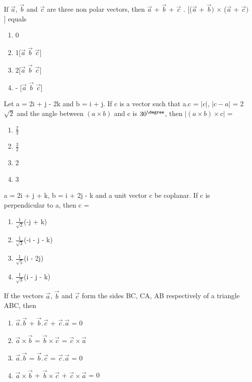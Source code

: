 \item If $\overrightarrow{a}$, $\overrightarrow{b}$ and $\overrightarrow{c}$ are three non polar vectors, then $\overrightarrow{a}$ + $\overrightarrow{b}$ + $\overrightarrow{c}$ . [($\overrightarrow{a}$ + $\overrightarrow{b})$ $\times$ ($\overrightarrow{a}$ + $\overrightarrow{c})$] equals
\begin{enumerate}
\item 0
\item 1[$\overrightarrow{a}$  $\overrightarrow{b}$  $\overrightarrow{c}$]
\item 2[$\overrightarrow{a}$  $\overrightarrow{b}$  $\overrightarrow{c}$]
\item - [$\overrightarrow{a}$  $\overrightarrow{b}$  $\overrightarrow{c}$]
\end{enumerate}

\item Let a = 2i + j - 2k and b = i + j. If c is a vector such that a.c = $|c|$, $|c - a|$ = 2$\sqrt{2}$ and the angle between $(a \times b)$ and c is $30^{\degree}$, then $| (a \times b) \times c| $ = 
\begin{enumerate}
\item $\frac{2}{3}$
\item $\frac{3}{2}$
\item 2
\item 3
\end{enumerate}

\item a = 2i + j + k, b = i + 2j - k and a unit vector c be coplanar. If c is perpendicular to a, then c = 
\begin{enumerate}
\item $\frac{1}{\sqrt{2}}$(-j + k)
\item $\frac{1}{\sqrt{3}}$(-i - j - k)
\item $\frac{1}{\sqrt{5}}$(i - 2j)
\item $\frac{1}{\sqrt{3}}$(i - j - k)
\end{enumerate}

\item If the vectors $\overrightarrow{a}$, $\overrightarrow{b}$ and $\overrightarrow{c}$ form the sides BC, CA, AB respectively of a triangle ABC, then
\begin{enumerate}
\item $\overrightarrow{a} . \overrightarrow{b}$ + $\overrightarrow{b} . \overrightarrow{c}$ + $\overrightarrow{c} . \overrightarrow{a}$ = 0
\item $\overrightarrow{a} \times \overrightarrow{b}$ = $\overrightarrow{b} \times \overrightarrow{c}$ = $\overrightarrow{c} \times \overrightarrow{a}$
\item $\overrightarrow{a} . \overrightarrow{b}$ = $\overrightarrow{b} . \overrightarrow{c}$ = $\overrightarrow{c} . \overrightarrow{a}$ = 0
\item $\overrightarrow{a} \times \overrightarrow{b}$ + $\overrightarrow{b} \times \overrightarrow{c}$ + $\overrightarrow{c} \times \overrightarrow{a}$ = 0
\end{enumerate}

